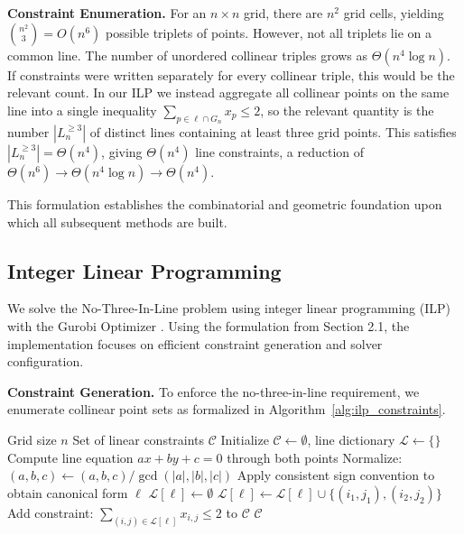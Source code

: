 \documentclass{article}
\theoremstyle{plain}
\theoremstyle{definition}
\theoremstyle{remark}
\begin{document}
\textbf{Constraint Enumeration.} For an $n \times n$ grid, there are $n^2$ grid cells, yielding $\binom{n^2}{3} = O(n^6)$ possible triplets of points. However, not all triplets lie on a common line. The number of unordered collinear triples grows as $\Theta(n^4 \log n)$. If constraints were written separately for every collinear triple, this would be the relevant count. In our ILP we instead aggregate all collinear points on the same line into a single inequality $\sum_{p\in \ell \cap G_n} x_p \le 2$, so the relevant quantity is the number $|L_n^{\ge 3}|$ of distinct lines containing at least three grid points. This satisfies $|L_n^{\ge 3}| = \Theta(n^4)$, giving $\Theta(n^4)$ line constraints, a reduction of $\Theta(n^6)\to\Theta(n^4\log n)\to\Theta(n^4)$.

This formulation establishes the combinatorial and geometric foundation upon which all subsequent methods are built.

\subsection{Integer Linear Programming}

We solve the No-Three-In-Line problem using integer linear programming (ILP)~\cite{Eppstein2018} with the Gurobi Optimizer \cite{GurobiOptimization2024}. Using the formulation from Section 2.1, the implementation focuses on efficient constraint generation and solver configuration.

\textbf{Constraint Generation.} To enforce the no-three-in-line requirement, we enumerate collinear point sets as formalized in Algorithm~\ref{alg:ilp_constraints}.
\begin{algorithm}[htbp]
\caption{ILP Constraint Generation}
\label{alg:ilp_constraints}
\begin{algorithmic}[1]
 Grid size $n$
 Set of linear constraints $\mathcal{C}$
\STATE Initialize $\mathcal{C} \gets \emptyset$, line dictionary $\mathcal{L} \gets \{\}$
    \STATE Compute line equation $ax + by + c = 0$ through both points
    \STATE Normalize: $(a, b, c) \gets (a, b, c) / \gcd(|a|, |b|, |c|)$
    \STATE Apply consistent sign convention to obtain canonical form $\ell$
        \STATE $\mathcal{L}[\ell] \gets \emptyset$
    \ENDIF
    \STATE $\mathcal{L}[\ell] \gets \mathcal{L}[\ell] \cup \{(i_1, j_1), (i_2, j_2)\}$
\ENDFOR
{}
    \STATE Add constraint: $\sum_{(i,j) \in \mathcal{L}[\ell]} x_{i,j} \leq 2$ to $\mathcal{C}$
\ENDFOR
{} $\mathcal{C}$
\end{algorithmic}
\end{algorithm}
\end{document}
